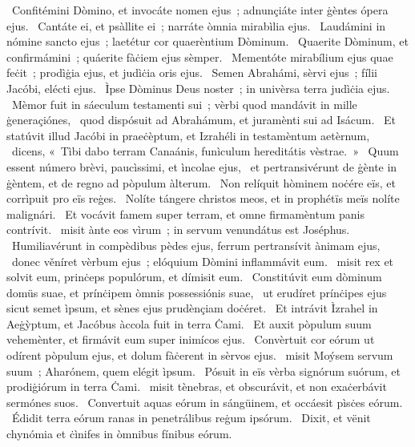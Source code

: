 \psalmChapterWithInscription{}
{ }
{%
~Confitémini Dòmino, et invocáte nomen ejus~; adnunçiáte inter ġèntes ópera ejus. 
~Cantáte ei, et psàllite ei~; narráte òmnia mirabìlia ejus. 
~Laudámini in nómine sancto ejus~; laetétur cor quaerèntium Dòminum. 
~Quaerite Dòminum, et confirmámini~; quáerite fàċiem ejus sèmper. 
~Mementóte mirabílium ejus quae feċit~; prodìġia ejus, et judìċia oris ejus. 
~Semen Abrahámi, sèrvi ejus~; fílii Jacóbi, elécti ejus. 
~Ìpse Dòminus Deus noster~; in univèrsa terra judìċia ejus. 
~Mèmor fuit in sáeculum testamenti sui~; vèrbi quod mandávit in mille ġeneraçiónes, 
~quod dispósuit ad Abrahámum, et juramènti sui ad Isácum. 
~Et statúvit illud Jacóbi in praeċèptum, et Izrahéli in testamèntum aetèrnum, 
~dicens, «~Tìbi dabo terram Canaánis, funìculum hereditátis vèstrae.~» 
~Quum essent número brèvi, paucìssimi, et ìncolae ejus, 
~et pertransivérunt de ġènte in ġèntem, et de regno ad pòpulum àlterum. 
~Non relíquit hòminem noċére eïs, et corrìpuit pro eïs reġes. 
~Nolíte tángere christos meos, et in prophétïs meïs nolíte malignári. 
~Et vocávit famem super terram, et omne firmamèntum panis contrívit. 
~misit ànte eos vìrum~; in servum venundátus est Joséphus. 
~Humiliavérunt in compèdibus pèdes ejus, ferrum pertransívit ànimam ejus, 
~donec věníret vèrbum ejus~; elóquium Dòmini inflammávit eum. 
~misit rex et solvit eum, prinċeps populórum, et dímisit eum. 
~Constitúvit eum dòminum domüs suae, et prínċipem òmnis possessiónis suae, 
~ut erudíret prínċipes ejus sicut semet ìpsum, et sènes ejus prudènçiam doċéret. 
~Et intrávit Ìzrahel in Aeġỳptum, et Jacóbus àccola fuit in terra Ċami. 
~Et auxit pòpulum suum vehemènter, et firmávit eum super inimícos ejus. 
~Convèrtuit cor eórum ut odírent pòpulum ejus, et dolum fàċerent in sèrvos ejus. 
~misit Moýsem servum suum~; Aharónem, quem elégit ìpsum. 
~Pósuit in eïs vèrba signórum suórum, et prodiġiórum in terra Ċami. 
~misit tènebras, et obscurávit, et non exaċerbávit sermónes suos. 
~Convertuit aquas eórum in sángüinem, et occáesit pìsċes eórum. 
~Édidit terra eórum ranas in penetrálibus reġum ipsórum. 
~Dixit, et vënit chynómia et ċìnifes in òmnibus fínibus eórum. 
}
